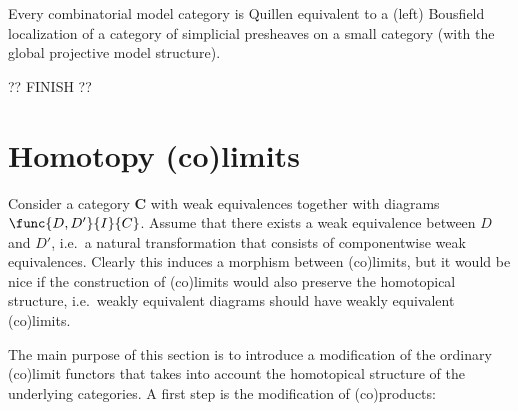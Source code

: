     \begin{theorem}[Dugger]\label{model:dugger}
        Every combinatorial model category is Quillen equivalent to a (left) Bousfield localization of a category of simplicial presheaves on a small category (with the global projective model structure).
    \end{theorem}

    ?? FINISH ??

\section{Homotopy (co)limits}

    Consider a category $\mathbf{C}$ with weak equivalences together with diagrams $\func{D,D'}{I}{C}$. Assume that there exists a weak equivalence between $D$ and $D'$, i.e.~a natural transformation that consists of componentwise weak equivalences. Clearly this induces a morphism between (co)limits, but it would be nice if the construction of (co)limits would also preserve the homotopical structure, i.e.~weakly equivalent diagrams should have weakly equivalent (co)limits.

    The main purpose of this section is to introduce a modification of the ordinary (co)limit functors that takes into account the homotopical structure of the underlying categories. A first step is the modification of (co)products:

